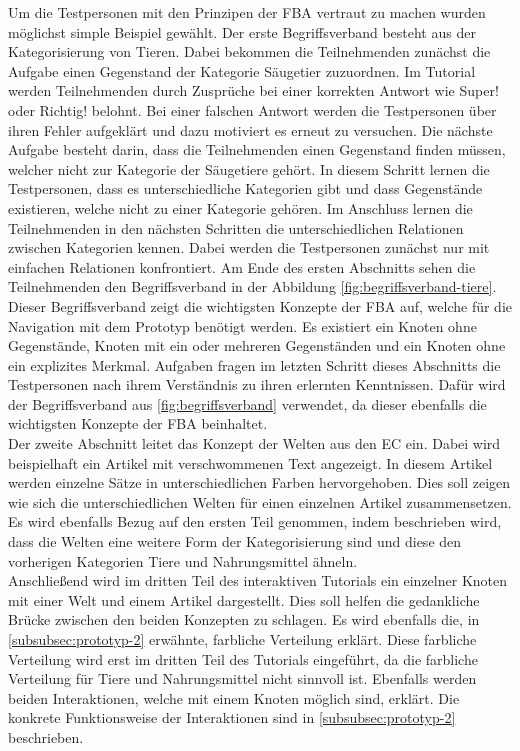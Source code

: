 Um die Testpersonen mit den Prinzipen der \ac{FBA} vertraut zu machen wurden möglichst simple Beispiel gewählt.
Der erste Begriffsverband besteht aus der Kategorisierung von Tieren.
Dabei bekommen die Teilnehmenden zunächst die Aufgabe einen Gegenstand der Kategorie Säugetier zuzuordnen.
Im Tutorial werden Teilnehmenden durch Zusprüche bei einer korrekten Antwort wie \glqq Super!\grqq{} oder \glqq Richtig!\grqq{} belohnt.
Bei einer falschen Antwort werden die Testpersonen über ihren Fehler aufgeklärt und dazu motiviert es erneut zu versuchen.
Die nächste Aufgabe besteht darin, dass die Teilnehmenden einen Gegenstand finden müssen, welcher nicht zur Kategorie der Säugetiere gehört.
In diesem Schritt lernen die Testpersonen, dass es unterschiedliche Kategorien gibt und dass Gegenstände existieren, welche nicht zu einer Kategorie gehören.
Im Anschluss lernen die Teilnehmenden in den nächsten Schritten die unterschiedlichen Relationen zwischen Kategorien kennen.
Dabei werden die Testpersonen zunächst nur mit einfachen Relationen konfrontiert.
Am Ende des ersten Abschnitts sehen die Teilnehmenden den Begriffsverband in der Abbildung \ref{fig:begriffsverband-tiere}.
Dieser Begriffsverband zeigt die wichtigsten Konzepte der \ac{FBA} auf, welche für die Navigation mit dem Prototyp benötigt werden.
Es existiert ein Knoten ohne Gegenstände, Knoten mit ein oder mehreren Gegenständen und ein Knoten ohne ein explizites Merkmal.
Aufgaben fragen im letzten Schritt dieses Abschnitts die Testpersonen nach ihrem Verständnis zu ihren erlernten Kenntnissen.
Dafür wird der Begriffsverband aus \autoref{fig:begriffsverband} verwendet, da dieser ebenfalls die wichtigsten Konzepte der \ac{FBA} beinhaltet.\\

Der zweite Abschnitt leitet das Konzept der Welten aus den \ac{EC} ein.
Dabei wird beispielhaft ein Artikel mit verschwommenen Text angezeigt.
In diesem Artikel werden einzelne Sätze in unterschiedlichen Farben hervorgehoben.
Dies soll zeigen wie sich die unterschiedlichen Welten für einen einzelnen Artikel zusammensetzen.
Es wird ebenfalls Bezug auf den ersten Teil genommen, indem beschrieben wird, dass die Welten eine weitere Form der Kategorisierung sind und diese den vorherigen Kategorien Tiere und Nahrungsmittel ähneln.\\

Anschließend wird im dritten Teil des interaktiven Tutorials ein einzelner Knoten mit einer Welt und einem Artikel dargestellt.
Dies soll helfen die gedankliche Brücke zwischen den beiden Konzepten zu schlagen.
Es wird ebenfalls die, in \autoref{subsubsec:prototyp-2} erwähnte, farbliche Verteilung erklärt.
Diese farbliche Verteilung wird erst im dritten Teil des Tutorials eingeführt, da die farbliche Verteilung für Tiere und Nahrungsmittel nicht sinnvoll ist.
Ebenfalls werden beiden Interaktionen, welche mit einem Knoten möglich sind, erklärt.
Die konkrete Funktionsweise der Interaktionen sind in \autoref{subsubsec:prototyp-2} beschrieben.\\

